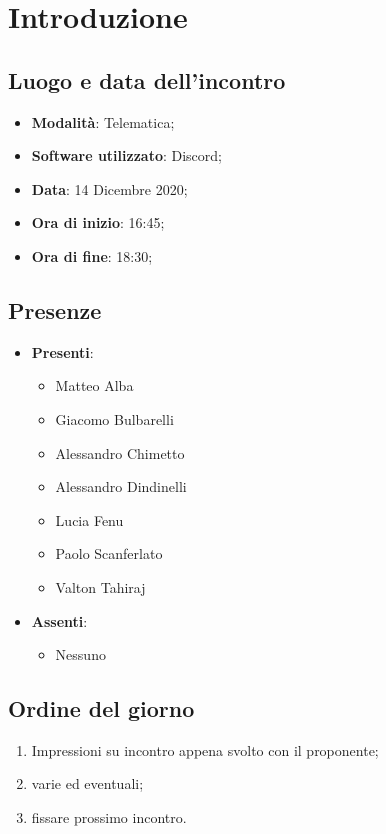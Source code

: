 \documentclass[]{article}
\begin{document}
	

	\newpage


	\section{Introduzione}
		\subsection{Luogo e data dell'incontro}
		\begin{itemize}
			\item \textbf{Modalità}: Telematica;
			\item \textbf{Software utilizzato}: Discord;
			\item \textbf{Data}: 14 Dicembre 2020;
			\item \textbf{Ora di inizio}: 16:45;
			\item \textbf{Ora di fine}: 18:30;
		\end{itemize}

		\subsection{Presenze}
		\begin{itemize}
			\item \textbf{Presenti}:
			\begin{itemize}
				\item Matteo Alba
				\item Giacomo Bulbarelli
				\item Alessandro Chimetto
				\item Alessandro Dindinelli
				\item Lucia Fenu
				\item Paolo Scanferlato
				\item Valton Tahiraj
			\end{itemize}
			\item \textbf{Assenti}:
			\begin{itemize}
				\item Nessuno
			\end{itemize}
		\end{itemize}


		\subsection{Ordine del giorno}
		\begin{enumerate}
			\item Impressioni su incontro appena svolto con il proponente;
			\item varie ed eventuali;
			\item fissare prossimo incontro.
		\end{enumerate}
\end{document}
